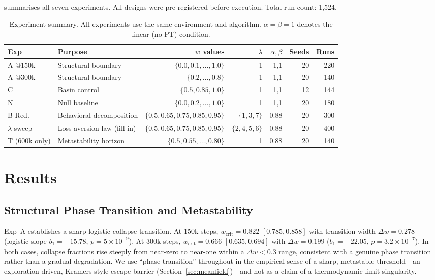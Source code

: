 \documentclass[letterpaper]{article}
\theoremstyle{plain}
\newcommand{\wcrit}{w_{\mathrm{crit}}}
\begin{document}
 summarises all seven experiments.
All designs were pre-registered before execution.
Total run count: 1,524.

\begin{table}[t]
\centering
\caption{Experiment summary. All experiments use the same environment and
algorithm.  $\alpha{=}\beta{=}1$ denotes the linear (no-PT) condition.}
\label{tab:experiments}
\small
\begin{tabular}{llrrrrr}
\toprule
Exp & Purpose & $w$ values & $\lambda$ & $\alpha,\beta$ & Seeds & Runs \\
\midrule
A @150k  & Structural boundary  & $\{0.0, 0.1,\ldots, 1.0\}$ & 1 & 1,1 & 20 & 220 \\
A @300k  & Structural boundary  & $\{0.2,\ldots, 0.8\}$       & 1 & 1,1 & 20 & 140 \\
C        & Basin control        & $\{0.5, 0.85, 1.0\}$        & 1 & 1,1 & 12 & 144 \\
N        & Null baseline        & $\{0.0, 0.2,\ldots, 1.0\}$  & 1 & 1,1 & 20 & 180 \\
B-Red.   & Behavioral decomposition & $\{0.5, 0.65, 0.75, 0.85, 0.95\}$ & $\{1,3,7\}$ & 0.88 & 20 & 300 \\
$\lambda$-sweep & Loss-aversion law (fill-in) & $\{0.5, 0.65, 0.75, 0.85, 0.95\}$ & $\{2,4,5,6\}$ & 0.88 & 20 & 400 \\
T (600k only) & Metastability horizon & $\{0.5, 0.55,\ldots, 0.80\}$ & 1 & 0.88 & 20 & 140 \\
\bottomrule
\end{tabular}
\end{table}

\section{Results}
\label{sec:results}

\subsection{Structural Phase Transition and Metastability}
\label{sec:results_structural}

Exp~A establishes a sharp logistic collapse transition.
At 150k steps, $\wcrit = 0.822$ $[0.785, 0.858]$ with transition width
$\Delta w = 0.278$ (logistic slope $b_1 = -15.78$, $p = 5 \times 10^{-9}$).
At 300k steps, $\wcrit = 0.666$ $[0.635, 0.694]$ with $\Delta w = 0.199$
($b_1 = -22.05$, $p = 3.2 \times 10^{-7}$).
In both cases, collapse fractions rise steeply from near-zero to near-one
within a $\Delta w < 0.3$ range, consistent with a genuine phase
transition rather than a gradual degradation.
We use ``phase transition'' throughout in the empirical sense of a sharp,
metastable threshold---an exploration-driven, Kramers-style escape barrier
(Section~\ref{sec:meanfield})---and not as a claim of a thermodynamic-limit
singularity.
\end{document}
